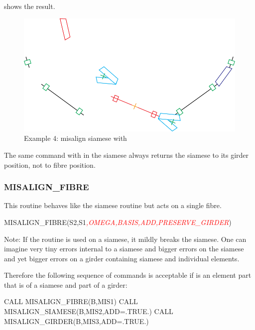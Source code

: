 shows the result.

\begin{figure}[ht]
  \centering
  \includegraphics[width=.9\textwidth]{illustrations/misalign-fig6}
  \caption{Example 4: misalign siamese with }
  \label{fig:Example-4}
\end{figure}

The same command with  in the siamese always returns the siamese
to its girder position, not to fibre position.


\subsubsection{MISALIGN_FIBRE}

%
This routine behaves like the siamese routine but acts on a single fibre.

\begin{ptccode}
MISALIGN_FIBRE(S2,S1\textit{\textcolor{red}{,OMEGA,BASIS,ADD,PRESERVE_GIRDER}})
\end{ptccode}

Note: If the  routine is used on a siamese, it mildly
breaks the siamese. One can imagine very tiny errors internal to a
siamese and bigger errors on the siamese and yet bigger errors on
a girder containing siamese and individual elements.

Therefore the following sequence of commands is acceptable if  is
an element part that is of a siamese and part of a girder:

\begin{ptccode}
CALL MISALIGN_FIBRE(B,MIS1)
CALL MISALIGN_SIAMESE(B,MIS2,ADD=.TRUE.)
CALL MISALIGN_GIRDER(B,MIS3,ADD=.TRUE.)
\end{ptccode}

